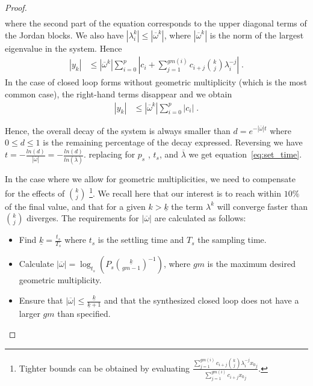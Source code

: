 \documentclass[a4paper,UKenglish]{lipics-v2018}
\newcommand{\mat}[1]{{#1}}
\renewcommand{\vec}[1]{{#1}}
\begin{document}
\begin{proof}
\begin{align*}
\end{align*}
where the second  part of the equation corresponds to the upper diagonal
terms of the Jordan blocks.  We also have $|\lambda_i^k|\leq
|\overline{\omega}^k|$, where $|\overline{\omega}^k|$ is the norm of the largest
eigenvalue in the system. Hence
%
\begin{align*}
|y_k|&\leq |\overline{\omega}^k|\sum_{i=0}^p \left|c_i + \sum\limits_{j=1}^{gm(i)}c_{i+j}\binom{k}{j} \lambda_i^{-j}\right|\;.
\end{align*}
%
In the case of closed loop forms without geometric multiplicity (which is
the most common case), the right-hand terms disappear and we obtain
%
\begin{align*}
|y_k|&\leq |\overline{\omega}^k|\sum_{i=0}^p |c_i|\;.
\end{align*}

Hence, the overall decay of the system is always smaller than
$d=e^{-|\overline{\omega}| t}$ where $0\leq d\leq 1$ is the remaining
percentage of the decay expressed.  Reversing we have
$t=-\frac{ln(d)}{|\overline{\omega}|}=-\frac{ln(d)}{ln(\overline{\lambda})}$. 
replacing for $p_s$ , $t_s$, and $\overline{\lambda}$ we get
equation~\eqref{eq:set_time}.
%

In the case where we allow for geometric multiplicities, we need to
compensate for the effects of $\binom{k}{j}$ \footnote{Tighter bounds can be
obtained by evaluating $\frac{\sum\limits_{j=1}^{gm(i)}c_{i+j}\binom{k}{j}
\lambda_i^{-j}{\vec{x}_0}_j}{\sum\limits_{j=1}^{gm(i)}c_{i+j}{\vec{x}_0}_j}$.}. 
We recall here that our interest is to reach within $10\%$ of the final
value, and that for a given $k>\underline{k}$ the term $\lambda^k$ will
converge faster than $\binom{k}{j}$ diverges.  The requirements for
$|\overline{\omega}|$ are calculated as follows:
%
\begin{itemize}
%
\item Find $\underline{k}=\frac{t_s}{T_s}$ where $t_s$ is the settling time and $T_s$ the sampling time.
%
\item Calculate $|\overline{\omega}|=\log_{t_s}\left(P_s\binom{\underline{k}}{gm-1}^{-1}\right)$,
where $gm$ is the maximum desired geometric multiplicity.
%
\item Ensure that $|\overline{\omega}| \leq \frac{\underline{k}}{\underline{k}+1}$ and that the
synthesized closed loop does not have a larger $gm$ than specified.
%
\end{itemize}
\end{proof}
\end{document}
